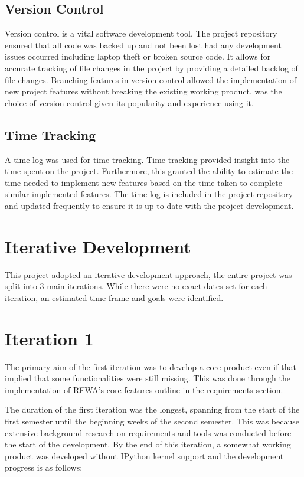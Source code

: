 \documentclass{l4proj}
\begin{document}
\subsection{Version Control}

Version control is a vital software development tool. The project repository ensured that all code was backed up and not been lost had any development issues occurred including laptop theft or broken source code. It allows for accurate tracking of file changes in the project by providing a detailed backlog of file changes. Branching features in version control allowed the implementation of new project features without breaking the existing working product. \cite{Github} was the choice of version control given its popularity and experience using it. 

\subsection{Time Tracking}
A time log was used for time tracking. Time tracking provided insight into the time spent on the project. Furthermore, this granted the ability to estimate the time needed to implement new features based on the time taken to complete similar implemented features. The time log is included in the project repository and updated frequently to ensure it is up to date with the project development.

\section{Iterative Development}

This project adopted an iterative development approach, the entire project was split into 3 main iterations. While there were no exact dates set for each iteration, an estimated time frame and goals were identified. 

\section{Iteration 1}

The primary aim of the first iteration was to develop a core product even if that implied that some functionalities were still missing. This was done through the implementation of RFWA's core features outline in the requirements section. 

The duration of the first iteration was the longest, spanning from the start of the first semester until the beginning weeks of the second semester. This was because extensive background research on requirements and tools was conducted before the start of the development. By the end of this iteration, a somewhat working product was developed without IPython kernel support and the development progress is as follows:
\end{document}
